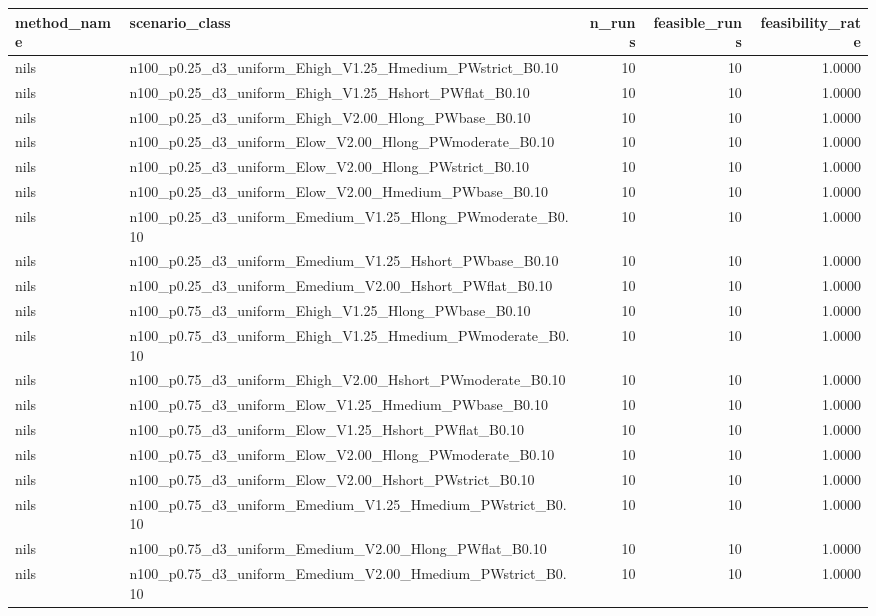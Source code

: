 \begin{tabular}{llrrr}
\toprule
method_name & scenario_class & n_runs & feasible_runs & feasibility_rate \\
\midrule
nils & n100_p0.25_d3_uniform_Ehigh_V1.25_Hmedium_PWstrict_B0.10 & 10 & 10 & 1.0000 \\
nils & n100_p0.25_d3_uniform_Ehigh_V1.25_Hshort_PWflat_B0.10 & 10 & 10 & 1.0000 \\
nils & n100_p0.25_d3_uniform_Ehigh_V2.00_Hlong_PWbase_B0.10 & 10 & 10 & 1.0000 \\
nils & n100_p0.25_d3_uniform_Elow_V2.00_Hlong_PWmoderate_B0.10 & 10 & 10 & 1.0000 \\
nils & n100_p0.25_d3_uniform_Elow_V2.00_Hlong_PWstrict_B0.10 & 10 & 10 & 1.0000 \\
nils & n100_p0.25_d3_uniform_Elow_V2.00_Hmedium_PWbase_B0.10 & 10 & 10 & 1.0000 \\
nils & n100_p0.25_d3_uniform_Emedium_V1.25_Hlong_PWmoderate_B0.10 & 10 & 10 & 1.0000 \\
nils & n100_p0.25_d3_uniform_Emedium_V1.25_Hshort_PWbase_B0.10 & 10 & 10 & 1.0000 \\
nils & n100_p0.25_d3_uniform_Emedium_V2.00_Hshort_PWflat_B0.10 & 10 & 10 & 1.0000 \\
nils & n100_p0.75_d3_uniform_Ehigh_V1.25_Hlong_PWbase_B0.10 & 10 & 10 & 1.0000 \\
nils & n100_p0.75_d3_uniform_Ehigh_V1.25_Hmedium_PWmoderate_B0.10 & 10 & 10 & 1.0000 \\
nils & n100_p0.75_d3_uniform_Ehigh_V2.00_Hshort_PWmoderate_B0.10 & 10 & 10 & 1.0000 \\
nils & n100_p0.75_d3_uniform_Elow_V1.25_Hmedium_PWbase_B0.10 & 10 & 10 & 1.0000 \\
nils & n100_p0.75_d3_uniform_Elow_V1.25_Hshort_PWflat_B0.10 & 10 & 10 & 1.0000 \\
nils & n100_p0.75_d3_uniform_Elow_V2.00_Hlong_PWmoderate_B0.10 & 10 & 10 & 1.0000 \\
nils & n100_p0.75_d3_uniform_Elow_V2.00_Hshort_PWstrict_B0.10 & 10 & 10 & 1.0000 \\
nils & n100_p0.75_d3_uniform_Emedium_V1.25_Hmedium_PWstrict_B0.10 & 10 & 10 & 1.0000 \\
nils & n100_p0.75_d3_uniform_Emedium_V2.00_Hlong_PWflat_B0.10 & 10 & 10 & 1.0000 \\
nils & n100_p0.75_d3_uniform_Emedium_V2.00_Hmedium_PWstrict_B0.10 & 10 & 10 & 1.0000 \\

\end{tabular}

